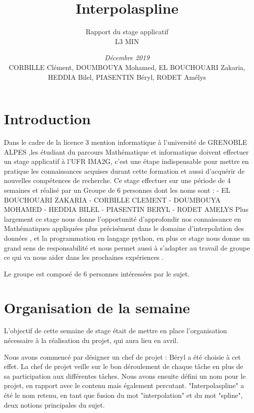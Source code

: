 \documentclass[a4paper,10pt]{article} %
\title{\textbf{Interpolaspline}}
\author{Rapport du stage applicatif\\ L3 MIN}
\date{\emph{Décembre 2019}\\CORBILLE Clément, DOUMBOUYA Mohamed, EL BOUCHOUARI Zakaria, HEDDIA Bilel, PIASENTIN Béryl, RODET Amélys}
\begin{document}

\maketitle %
\tableofcontents %

\newpage

\section*{Introduction}
Dans le cadre  de la licence 3 mention  informatique à l’université de GRENOBLE ALPES ,les étudiant du parcours Mathématique et informatique doivent effectuer un stage applicatif à l’UFR IMA2G, c'est une étape indispensable pour mettre en pratique les connaissances acquises durant cette formation et aussi d’acquérir de nouvelles compétences de recherche. Ce stage effectuer sur une période de 4 semaines et réalisé par un Groupe de 6 personnes dont les noms sont :
                - EL BOUCHOUARI ZAKARIA
                - CORBILLE CLEMENT
                - DOUMBOUYA MOHAMED
                - HEDDIA BILEL
                - PIASENTIN BERYL
                - RODET AMELYS
Plus largement  ce stage  nous donne l’opportunité d’approfondir nos connaissance  en Mathématiques appliquées plus précisément dans le domaine d’interpolation des données ,  et la programmation en langage  python, en plus ce stage nous donne un grand sens de responsabilité et nous permet aussi à  s’adapter au travail de groupe ce qui va nous aider dans les prochaines expériences .



Le groupe est composé de 6 personnes intéressées par le sujet.

\section{Organisation de la semaine}

L'objectif de cette semaine de stage était de mettre en place l'organisation nécessaire à la réalisation du projet, qui aura lieu en avril.

Nous avons commencé par désigner un chef de projet : Béryl a été choisie à cet effet. La chef de projet veille sur le bon déroulement de chaque tâche en plus de sa participation aux différentes tâches. Nous avons ensuite défini un nom pour le projet, en rapport avec le contenu mais également percutant. "Interpolaspline" a été le nom retenu, en tant que fusion du mot "interpolation" et du mot "spline", deux notions principales du sujet.
\end{document}
